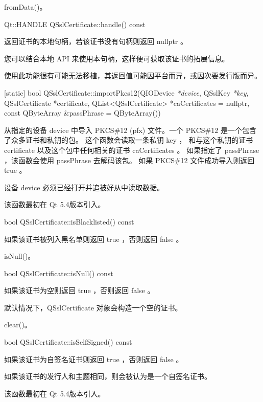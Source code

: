 \begin{seeAlso}
fromData()。
\end{seeAlso}

Qt::HANDLE QSslCertificate::handle() const

返回证书的本地句柄，若该证书没有句柄则返回 nullptr 。

您可以结合本地 API 来使用本句柄，这样便可获取该证书的拓展信息。

\begin{warning}
使用此功能很有可能无法移植，其返回值可能因平台而异，或因次要发行版而异。
\end{warning}

[static] bool QSslCertificate::importPkcs12(QIODevice \emph{*device}, 
QSslKey \emph{*key}, QSslCertificate *certificate, QList<QSslCertificate> *caCertificates = nullptr, const QByteArray \&passPhrase = QByteArray())

从指定的设备 device 中导入 PKCS\#12 (pfx) 文件。一个 PKCS\#12 是一个包含了众多证书和私钥的包。
这个函数会读取一条私钥 key ，
和与这个私钥的证书 certificate 以及这个包中任何相关的证书 caCertificates 。
 如果指定了 passPhrase ，该函数会使用 passPhrase 去解码该包。
 如果 PKCS\#12 文件成功导入则返回 true 。

 \begin{notice}
	设备 device 必须已经打开并追被好从中读取数据。
 \end{notice}

该函数最初在 Qt 5.4版本引入。

bool QSslCertificate::isBlacklisted() const

如果该证书被列入黑名单则返回 true ，否则返回 false 。

\begin{seeAlso}
isNull()。
\end{seeAlso}

bool QSslCertificate::isNull() const

如果该证书为空则返回 true ，否则返回 false 。

默认情况下，QSslCertificate 对象会构造一个空的证书。

\begin{seeAlso}
clear()。
\end{seeAlso}

bool QSslCertificate::isSelfSigned() const

如果该证书为自签名证书则返回 true ，否则返回 false 。

如果该证书的发行人和主题相同，则会被认为是一个自签名证书。

该函数最初在 Qt 5.4版本引入。

